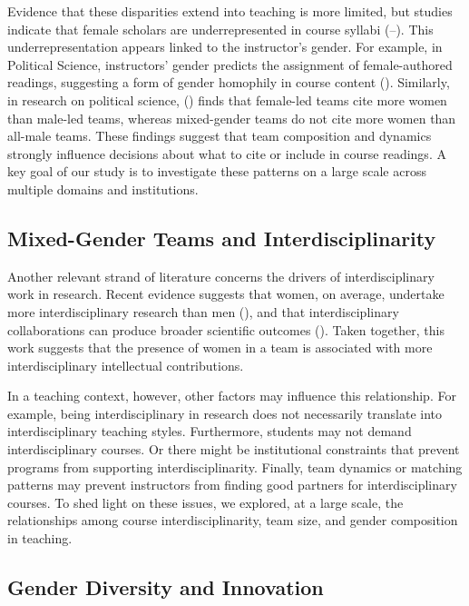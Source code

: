\documentclass[
  british,
  12pt, %
]{article}
\begin{document}
Evidence that these disparities extend into teaching is more limited, but studies indicate that female scholars are underrepresented in course syllabi (--). This underrepresentation appears linked to the instructor's gender. For example, in Political Science, instructors' gender predicts the assignment of female-authored readings, suggesting a form of gender homophily in course content (). Similarly, in research on political science, () finds that female-led teams cite more women than male-led teams, whereas mixed-gender teams do not cite more women than all-male teams. These findings suggest that team composition and dynamics strongly influence decisions about what to cite or include in course readings. A key goal of our study is to investigate these patterns on a large scale across multiple domains and institutions.

\subsection{Mixed-Gender Teams and Interdisciplinarity}\label{mixed-gender-teams-and-interdisciplinarity}

Another relevant strand of literature concerns the drivers of interdisciplinary work in research. Recent evidence suggests that women, on average, undertake more interdisciplinary research than men (), and that interdisciplinary collaborations can produce broader scientific outcomes (). Taken together, this work suggests that the presence of women in a team is associated with more interdisciplinary intellectual contributions.

In a teaching context, however, other factors may influence this relationship. For example, being interdisciplinary in research does not necessarily translate into interdisciplinary teaching styles. Furthermore, students may not demand interdisciplinary courses. Or there might be institutional constraints that prevent programs from supporting interdisciplinarity. Finally, team dynamics or matching patterns may prevent instructors from finding good partners for interdisciplinary courses. To shed light on these issues, we explored, at a large scale, the relationships among course interdisciplinarity, team size, and gender composition in teaching.

\subsection{Gender Diversity and Innovation}\label{gender-diversity-and-innovation}
\end{document}
